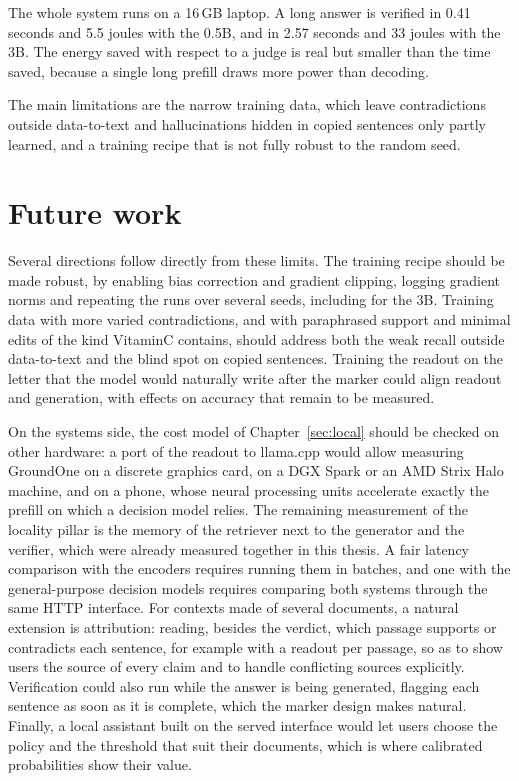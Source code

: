 The whole system runs on a 16\,GB laptop. A long answer is verified in 0.41 seconds and 5.5 joules with the 0.5B, and in
2.57 seconds and 33 joules with the 3B. The energy saved with respect to a judge is real but smaller than the time saved,
because a single long prefill draws more power than decoding.

The main limitations are the narrow training data, which leave contradictions outside data-to-text and hallucinations
hidden in copied sentences only partly learned, and a training recipe that is not fully robust to the random seed.

\section{Future work}
\label{sec:concl-future}

Several directions follow directly from these limits. The training recipe should be made robust, by enabling bias
correction and gradient clipping, logging gradient norms and repeating the runs over several seeds, including for the 3B.
Training data with more varied contradictions, and with paraphrased support and minimal edits of the kind VitaminC
contains, should address both the weak recall outside data-to-text and the blind spot on copied sentences. Training the
readout on the letter that the model would naturally write after the marker could align readout and generation, with
effects on accuracy that remain to be measured.

On the systems side, the cost model of Chapter~\ref{sec:local} should be checked on other hardware: a port of the
readout to llama.cpp would allow measuring GroundOne on a discrete graphics card, on a DGX Spark or an AMD Strix Halo
machine, and on a phone, whose neural processing units accelerate exactly the prefill on which a decision model relies. The
remaining measurement of the locality pillar is the memory of the retriever next to the generator and the verifier,
which were already measured together in this thesis. A fair latency comparison with the
encoders requires running them in batches, and one with the general-purpose decision models requires comparing both systems
through the same HTTP interface. For contexts made of several documents, a natural extension is attribution: reading, besides the verdict, which
passage supports or contradicts each sentence, for example with a readout per passage, so as to show users the source of
every claim and to handle conflicting sources explicitly. Verification could also run while the answer is being generated, flagging each sentence
as soon as it is complete, which the marker design makes natural. Finally, a local assistant built on the served
interface would let users choose the policy and the threshold that suit their documents, which is where calibrated
probabilities show their value.

